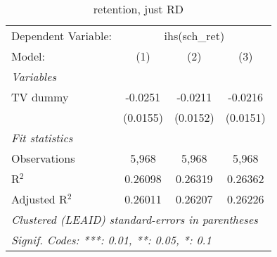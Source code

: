 \begin{table}[htbp]
\centering
\caption{retention, just RD}
\begin{tabular}{lccc}
\tabularnewline\midrule\midrule
Dependent Variable:&\multicolumn{3}{c}{ihs(sch\_ret)}\\
Model:&(1) & (2) & (3)\\
\midrule \emph{Variables}&   &   &  \\
TV dummy & -0.0251 & -0.0211 & -0.0216\\
  &(0.0155) & (0.0152) & (0.0151)\\
\midrule \emph{Fit statistics}&  & & \\
Observations & 5,968&5,968&5,968\\
R$^2$ & 0.26098&0.26319&0.26362\\
Adjusted R$^2$ & 0.26011&0.26207&0.26226\\
\midrule\midrule\multicolumn{4}{l}{\emph{Clustered (LEAID) standard-errors in parentheses}}\\
\multicolumn{4}{l}{\emph{Signif. Codes: ***: 0.01, **: 0.05, *: 0.1}}\\
\end{tabular}
\end{table}

